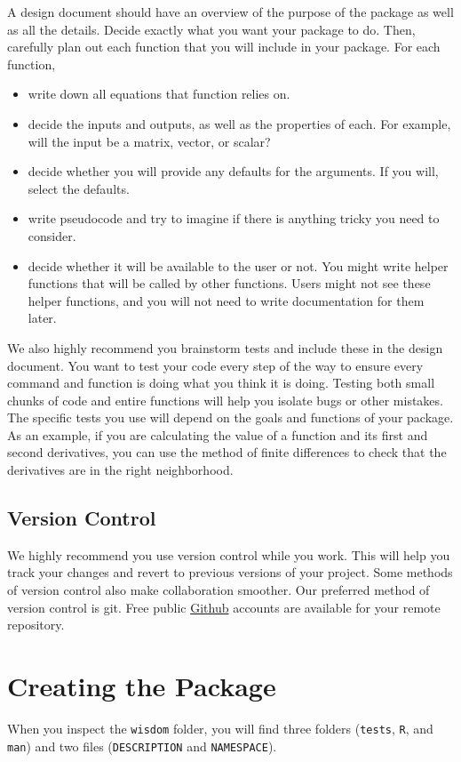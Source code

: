 \documentclass{article}
\begin{document}
A design document should have an overview of the purpose of the package as well as all the details. Decide exactly what you want your package to do. Then, carefully plan out each function that you will include in your package. For each function,
\begin{itemize}
\item write down all equations that function relies on.
\item decide the inputs and outputs, as well as the properties of each. For example, will the input be a matrix, vector, or scalar?
\item decide whether you will provide any defaults for the arguments. If you will, select  the defaults.
\item write pseudocode  and try to imagine if there is anything tricky you need to consider. 
\item decide whether it will be available to the user or not. You might write helper functions that will be called by other functions. Users might not see these helper functions, and you will not need to write documentation for them later.
\end{itemize}

We also highly recommend you brainstorm tests and include these in the design document. You want to test your code every step of the way to ensure every command and function is doing what you think it is doing. Testing both small chunks of code and entire functions will help you isolate bugs or other mistakes. The specific tests you use will depend on the goals and functions of your package. As an example, if you are calculating the value of a function and its first and second derivatives, you can use the method of finite differences to check that the derivatives are in the right neighborhood. 


\subsection{Version Control}
We highly recommend you use version control while you work. This will help you track your changes and revert to previous versions of your project. Some methods of version control also make collaboration smoother. Our preferred method of version control is git. Free public \href{https://github.com}{Github} accounts are available for your remote repository.

\section{Creating the Package}
When you inspect the \texttt{wisdom} folder, you will find three folders (\texttt{tests}, \texttt{R}, and \texttt{man}) and two files (\texttt{DESCRIPTION} and \texttt{NAMESPACE}). 
\end{document}

